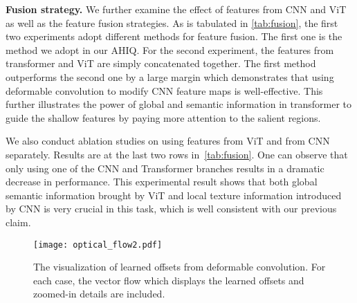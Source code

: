 \documentclass[10pt,twocolumn,letterpaper]{article}
\begin{document}
\begin{table}[ht]
\centering
\caption{Comparison of different feature extraction backbones on the NTIRE 2022 IQA Challenge testing datasets.}
\label{tab:backbone}
\end{table}

\vspace{2pt}
\noindent\textbf{Fusion strategy.} We further examine the effect of features from CNN and ViT as well as the feature fusion strategies. As is tabulated in \cref{tab:fusion}, the first two experiments adopt different methods for feature fusion. The first one is the method we adopt in our AHIQ. For the second experiment, the features from transformer and ViT are simply concatenated together. The first method outperforms the second one by a large margin which demonstrates that using deformable convolution to modify CNN feature maps is well-effective. This further illustrates the power of global and semantic information in transformer to guide the shallow features by paying more attention to the salient regions.

We also conduct ablation studies on using features from ViT and from CNN separately. Results are at the last two rows in~\cref{tab:fusion}. One can observe that only using one of the CNN and Transformer branches results in a dramatic decrease in performance. This experimental result shows that both global semantic information brought by ViT and local texture information introduced by CNN is very crucial in this task, which is well consistent with our previous claim.
\begin{figure}[th]
\centering
\texttt{[image: optical\_flow2.pdf]}
\caption{The visualization of learned offsets from deformable convolution. For each case, the vector flow which displays the learned offsets and zoomed-in details are included.}
\label{fig:optical}
\end{figure}
\end{document}
